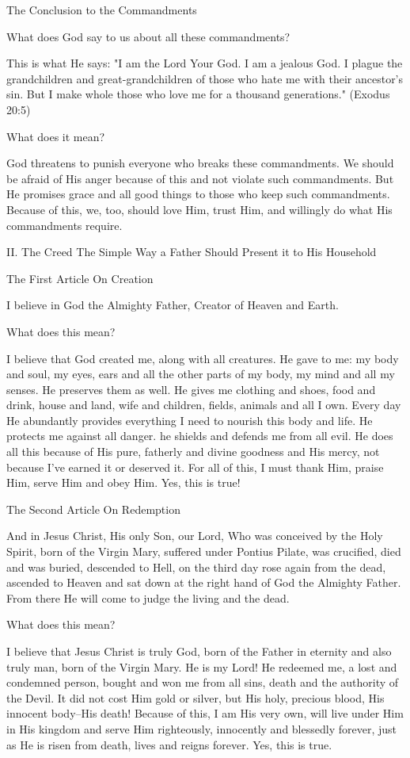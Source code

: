 The Conclusion to the Commandments

What does God say to us about all these commandments?

This is what He says:
"I am the Lord Your God. I am a jealous God. I plague the grandchildren
and great-grandchildren of those who hate me with their ancestor's sin.
But I make whole those who love me for a thousand generations." (Exodus
20:5)

What does it mean?

God threatens to punish everyone who breaks these commandments. We
should be afraid of His anger because of this and not violate such
commandments. But He promises grace and all good things to those who
keep such commandments. Because of this, we, too, should love Him,
trust Him, and willingly do what His commandments require.

II. The Creed
The Simple Way a Father Should Present it to His Household

The First Article
On Creation

I believe in God the Almighty Father, Creator of Heaven and Earth.

What does this mean?

I believe that God created me, along with all creatures. He gave to me:
my body and soul, my eyes, ears and all the other parts of my body, my
mind and all my senses. He preserves them as well. He gives me clothing
and shoes, food and drink, house and land, wife and children, fields,
animals and all I own. Every day He abundantly provides everything I
need to nourish this body and life. He protects me against all danger.
he shields and defends me from all evil. He does all this because of
His pure, fatherly and divine goodness and His mercy, not because I've
earned it or deserved it. For all of this, I must thank Him, praise
Him, serve Him and obey Him. Yes, this is true!

The Second Article
On Redemption

And in Jesus Christ, His only Son, our Lord, Who was conceived by the
Holy Spirit, born of the Virgin Mary, suffered under Pontius Pilate,
was crucified, died and was buried, descended to Hell, on the third day
rose again from the dead, ascended to Heaven and sat down at the right
hand of God the Almighty Father. From there He will come to judge the
living and the dead.

What does this mean?

I believe that Jesus Christ is truly God, born of the Father in
eternity and also truly man, born of the Virgin Mary. He is my Lord! He
redeemed me, a lost and condemned person, bought and won me from all
sins, death and the authority of the Devil. It did not cost Him gold or
silver, but His holy, precious blood, His innocent body--His death!
Because of this, I am His very own, will live under Him in His kingdom
and serve Him righteously, innocently and blessedly forever, just as He
is risen from death, lives and reigns forever. Yes, this is true.

